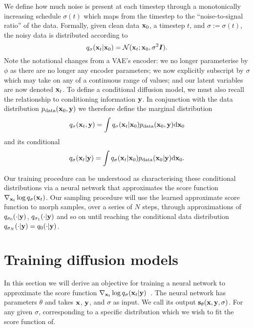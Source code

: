 We define how much noise is present at each timestep through a monotonically increasing schedule $\sigma(t)$ which maps from the timestep to the ``noise-to-signal ratio'' of the data. Formally, given clean data ${\mathbf{x}}_0$, a timestep $t$, and $\sigma := \sigma(t)$, the noisy data is distributed according to
\begin{equation} \label{eq:diffusion-xt-given-x0}
    q_\sigma({\mathbf{x}}_t|{\mathbf{x}}_0) = {\mathcal{N}} ( {\mathbf{x}}_t ; {\mathbf{x}}_0, \sigma^2 {\bm{I}} ).
\end{equation}
Note the notational changes from a VAE's encoder: we no longer parameterise by $\phi$ as there are no longer any encoder parameters; we now explicitly subscript by $\sigma$ which may take on any of a continuous range of values; and our latent variables are now denoted ${\mathbf{x}}_t$. To define a conditional diffusion model, we must also recall the relationship to conditioning information ${\mathbf{y}}$. In conjunction with the data distribution $p_{\rm{data}}({\mathbf{x}}_0, {\mathbf{y}})$ we therefore define the marginal distribution
\begin{equation}
    q_\sigma({\mathbf{x}}_t,{\mathbf{y}}) = \int q_\sigma({\mathbf{x}}_t|{\mathbf{x}}_0) p_{\rm{data}}({\mathbf{x}}_0, {\mathbf{y}}) \mathrm{d} {\mathbf{x}}_0
\end{equation}
and its conditional
\begin{equation}
    q_\sigma({\mathbf{x}}_t|{\mathbf{y}}) = \int q_\sigma({\mathbf{x}}_t|{\mathbf{x}}_0) p_{\rm{data}}({\mathbf{x}}_0|{\mathbf{y}}) \mathrm{d} {\mathbf{x}}_0.
\end{equation}

Our training procedure can be understood as characterising these conditional distributions via a neural network that approximates the score function $\nabla_{{\mathbf{x}}_t} \log q_\sigma({\mathbf{x}}_t)$. Our sampling procedure will use the learned approximate score function to morph samples, over a series of $N$ steps, through approximations of $q_{\sigma_0}(\cdot | {\mathbf{y}})$, $q_{\sigma_1}(\cdot | {\mathbf{y}})$ and so on until reaching the conditional data distribution $q_{\sigma_N}(\cdot | {\mathbf{y}}) = q_{0}(\cdot | {\mathbf{y}})$. 

\section{Training diffusion models}

In this section we will derive an objective for training a neural network to approximate the score function $\nabla_{{\mathbf{x}}_t} \log q_\sigma({\mathbf{x}}_t |{\mathbf{y}})$~\citep{vincent2011connection,song2019generative}. The neural network has parameters $\theta$ and takes ${\mathbf{x}}$, ${\mathbf{y}}$, and $\sigma$ as input. We call its output ${\mathbf{s}}_\theta({\mathbf{x}}, {\mathbf{y}}, \sigma)$. For any given $\sigma$, corresponding to a specific distribution which we wish to fit the score function of. 

